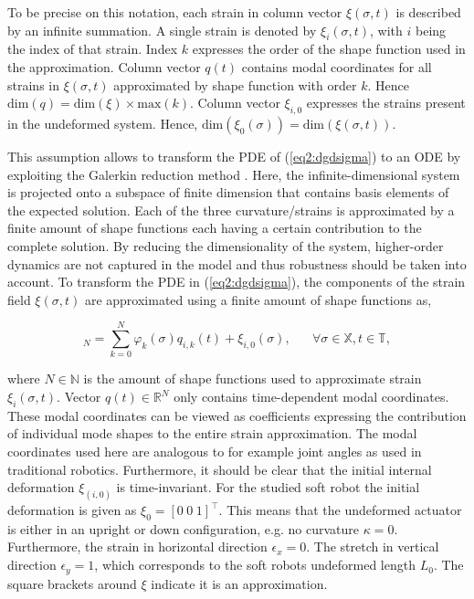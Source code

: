 To be precise on this notation, each strain in column vector $\xi(\sigma,t)$ is described by an infinite summation. A single strain is denoted by $\xi_i(\sigma,t)$, with $i$ being the index of that strain. Index $k$ expresses the order of the shape function used in the approximation. Column vector $q(t)$ contains modal coordinates for all strains in $\xi(\sigma,t)$ approximated by shape function with order $k$. Hence $\text{dim}(q) = \text{dim}(\xi) \times \text{max}(k)$. Column vector $\xi_{i,0}$ expresses the strains present in the undeformed system. Hence, $\text{dim}(\xi_0(\sigma)) = \text{dim}(\xi(\sigma,t))$.

This assumption allows to transform the PDE of (\ref{eq2:dgdsigma}) to an ODE by exploiting the Galerkin reduction method \cite{Galerkin}. Here, the infinite-dimensional system is projected onto a subspace of finite dimension that contains basis elements of the expected solution. Each of the three curvature/strains is approximated by a finite amount of shape functions each having a certain contribution to the complete solution. By reducing the dimensionality of the system, higher-order dynamics are not captured in the model and thus robustness should be taken into account. To transform the PDE in (\ref{eq2:dgdsigma}), the components of the strain field $\xi(\sigma,t)$ are approximated using a finite amount of shape functions as,

\begin{equation}
    [\xi_i(\sigma,t)]_N = \sum_{k=0}^N \varphi_k(\sigma)q_{i,k}(t) + \xi_{i,0}(\sigma), \hspace{20pt} \forall \sigma \in \mathbb{X}, t \in \mathbb{T},
    \label{eq2:strainapprox}
\end{equation}

where $N \in \mathbb{N}$ is the amount of shape functions used to approximate strain $\xi_i(\sigma,t)$. Vector $q(t) \in \mathbb{R}^N$ only contains time-dependent modal coordinates. These modal coordinates can be viewed as coefficients expressing the contribution of individual mode shapes to the entire strain approximation. The modal coordinates used here are analogous to for example joint angles as used in traditional robotics. Furthermore, it should be clear that the initial internal deformation $\xi_{(i,0)}$ is time-invariant. For the studied soft robot the initial deformation is given as $\xi_0 = [0 \hspace{3pt} 0 \hspace{3pt} 1]^\top$. This means that the undeformed actuator is either in an upright or down configuration, e.g. no curvature $\kappa = 0$. Furthermore, the strain in horizontal direction $\epsilon_x = 0$. The stretch in vertical direction $\epsilon_y = 1$, which corresponds to the soft robots undeformed length $L_0$. The square brackets around $\xi$ indicate it is an approximation. 

